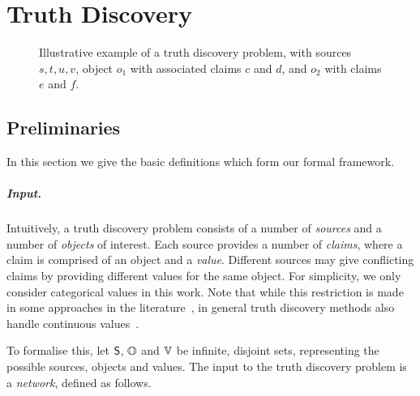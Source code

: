 \chapter{Truth Discovery}
\label{chapter_td}


\begin{figure}
    \centering
    \caption{
        Illustrative example of a truth discovery problem, with sources
        $s, t, u, v$, object $o_1$ with associated claims $c$ and $d$, and
        $o_2$ with claims $e$ and $f$.
    }
    \label{td_new_fig_intro_example}
\end{figure}

\section{Preliminaries}
\label{td_new_sec_preliminaries}

In this section we give the basic definitions which form our formal framework.

\paragraph{Input.}

Intuitively, a truth discovery problem consists of a number of \emph{sources}
and a number of \emph{objects} of interest. Each source provides a number of
\emph{claims}, where a claim is comprised of an object and a \emph{value}.
Different sources may give conflicting claims by providing different values for
the same object. For simplicity, we only consider categorical values in this
work. Note that while this restriction is made in some approaches in the
literature~\cite{pasternack2010,yin2008,wang_truth_2012,dong_truth_2009,zhang2018},
in general truth discovery methods also handle continuous
values~\cite{li2016,xiao2016}.

To formalise this, let $\S$, $\O$ and $\V$ be infinite, disjoint sets,
representing the possible sources, objects and values. The input to the truth
discovery problem is a \emph{network}, defined as follows.

